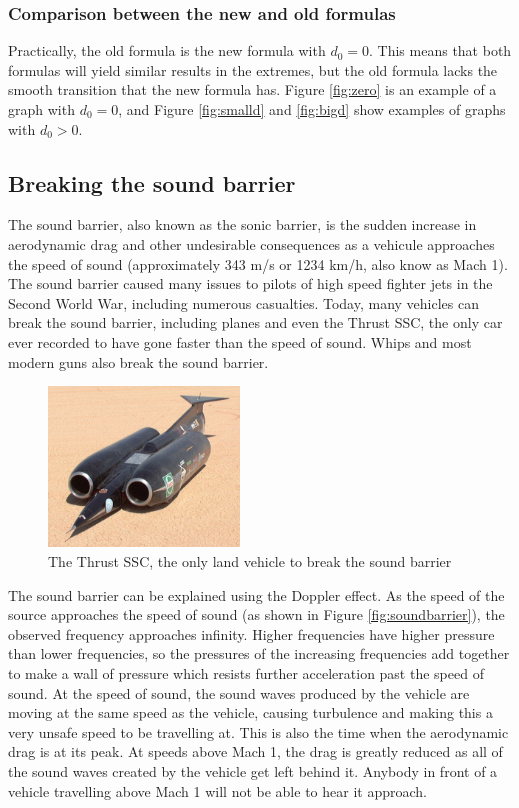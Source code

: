 \documentclass[12pt]{article}
\begin{document}
\subsubsection{Comparison between the new and old formulas}
Practically, the old formula is the new formula with $d_0 = 0$. This means that both formulas will yield similar results in the extremes, but the old formula lacks the smooth transition that the new formula has. Figure \ref{fig:zero} is an example of a graph with $d_0 = 0$, and Figure \ref{fig:smalld} and \ref{fig:bigd} show examples of graphs with $d_0 > 0$.

\subsection{Breaking the sound barrier}

The sound barrier, also known as the sonic barrier, is the sudden increase in aerodynamic drag and other undesirable consequences as a vehicule approaches the speed of sound (approximately 343 m/s or 1234 km/h, also know as Mach 1). The sound barrier caused many issues to pilots of high speed fighter jets in the Second World War, including numerous casualties. Today, many vehicles can break the sound barrier, including planes and even the Thrust SSC, the only car ever recorded to have gone faster than the speed of sound. Whips and most modern guns also break the sound barrier.

\begin{figure}[H]
	\centering
	\includegraphics[width=2in]{thrust_ssc}
	\caption{The Thrust SSC, the only land vehicle to break the sound barrier}
	\label{fig:thrust}
\end{figure}

The sound barrier can be explained using the Doppler effect. As the speed of the source approaches the speed of sound (as shown in Figure \ref{fig:soundbarrier}), the observed frequency approaches infinity. Higher frequencies have higher pressure than lower frequencies, so the pressures of the increasing frequencies add together to make a wall of pressure which resists further acceleration past the speed of sound. At the speed of sound, the sound waves produced by the vehicle are moving at the same speed as the vehicle, causing turbulence and making this a very unsafe speed to be travelling at. This is also the time when the aerodynamic drag is at its peak. At speeds above Mach 1, the drag is greatly reduced as all of the sound waves created by the vehicle get left behind it. Anybody in front of a vehicle travelling above Mach 1 will not be able to hear it approach. 
\end{document}
